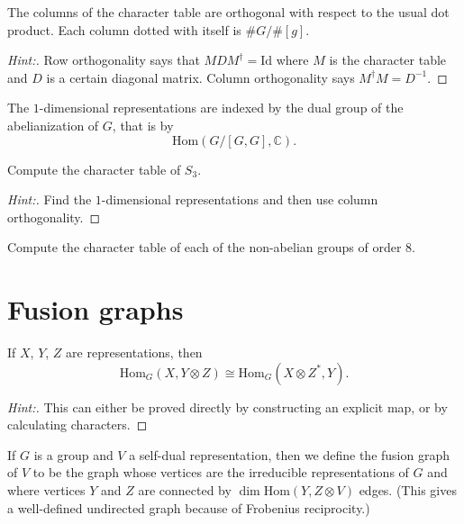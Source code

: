 \documentclass[11pt]{article}
\begin{document}
\begin{exercise}
The columns of the character table are orthogonal with respect to the usual dot product.  Each column dotted with itself is $\#G/\#[g]$.
\end{exercise}
\begin{proof}[Hint:]
Row orthogonality says that $M D M^\dagger = \mathrm{Id}$ where $M$ is the character table and $D$ is a certain diagonal matrix.  Column orthogonality says $M^\dagger M = D^{-1}$.
\end{proof}

\begin{exercise}
The $1$-dimensional representations are indexed by the dual group of the abelianization of $G$, that is by 
$$\mathrm{Hom}(G/[G,G],\mathbb{C}).$$
\end{exercise}

\begin{exercise}
Compute the character table of $S_3$.
\end{exercise}
\begin{proof}[Hint:]
Find the $1$-dimensional representations and then use column orthogonality.
\end{proof}

\begin{exercise}
Compute the character table of each of the non-abelian groups of order $8$.
\end{exercise}

\section{Fusion graphs}

\begin{exercise}
If $X$, $Y$, $Z$ are representations, then
$$\mathrm{Hom}_G(X, Y \otimes Z) \cong \mathrm{Hom}_G(X \otimes Z^*, Y).$$
\end{exercise}
\begin{proof}[Hint:]
This can either be proved directly by constructing an explicit map, or by calculating characters.
\end{proof}


\begin{definition}
If $G$ is a group and $V$ a self-dual representation, then we define the fusion graph of $V$ to be the graph whose vertices are the irreducible representations of $G$ and where vertices $Y$ and $Z$ are connected by $\dim \mathrm{Hom}(Y,Z\otimes V)$ edges.  (This gives a well-defined undirected graph because of Frobenius reciprocity.)
\end{definition}
\end{document}
